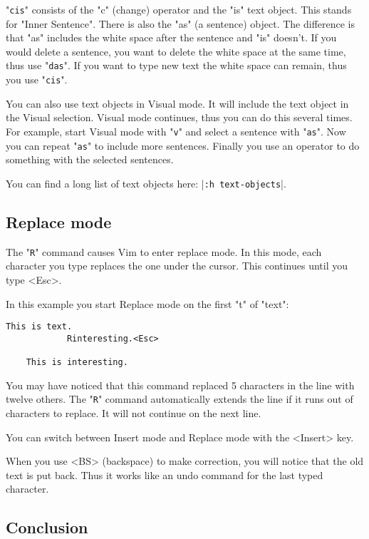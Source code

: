 "\texttt{cis}" consists of the "c" (change) operator and the "is" text object.
This stands for "Inner Sentence".
There is also the "as" (a sentence) object.
The difference is that "as" includes the white space after the sentence and "is" doesn't.
If you would delete a sentence, you want to delete the white space at the same time, thus use "\texttt{das}".
If you want to type new text the white space can remain, thus you use "\texttt{cis}".

You can also use text objects in Visual mode.
It will include the text object in the Visual selection.
Visual mode continues, thus you can do this several times.
For example, start Visual mode with "\texttt{v}" and select a sentence with "\texttt{as}".
Now you can repeat "\texttt{as}" to include more sentences.
Finally you use an operator to do something with the selected sentences.

You can find a long list of text objects here: |\texttt{:h text-objects}|.

\subsection{Replace mode}
\label{Replace mode}

The "\texttt{R}" command causes Vim to enter replace mode.
In this mode, each character you type replaces the one under the cursor.
This continues until you type <Esc>.

In this example you start Replace mode on the first "t" of "text":

\begin{Verbatim}[samepage=true]
    This is text. 
            Rinteresting.<Esc>

    This is interesting. 
\end{Verbatim}

You may have noticed that this command replaced 5 characters in the line with twelve others.
The "\texttt{R}" command automatically extends the line if it runs out of characters to replace.
It will not continue on the next line.

You can switch between Insert mode and Replace mode with the <Insert> key.

When you use <BS> (backspace) to make correction, you will notice that the old text is put back.
Thus it works like an undo command for the last typed character.

\subsection{Conclusion}

